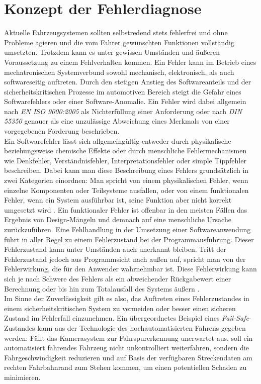 \section{Konzept der Fehlerdiagnose} \label{sec:KonzeptDiagnose} %

Aktuelle Fahrzeugsystemen sollten selbstredend stets fehlerfrei und ohne Probleme agieren und die vom Fahrer gewünschten Funktionen vollständig umsetzten. Trotzdem kann es unter gewissen Umständen und äußeren Voraussetzung zu einem Fehlverhalten kommen. Ein Fehler kann im Betrieb eines mechatronischen Systemverbund sowohl mechanisch, elektronisch, als auch softwareseitig auftreten. Durch den stetigen Anstieg des Softwareanteils und der sicherheitskritischen Prozesse im automotiven Bereich steigt die Gefahr eines Softwarefehlers oder einer Software-Anomalie. Ein Fehler wird dabei allgemein nach \emph{EN ISO 9000:2005} \cite{DINDeutschesInstitutfurNormunge.V..201511} als \glqq Nichterfüllung einer Anforderung\grqq{} oder nach \emph{DIN 55350} \cite{DINDeutschesInstitutfurNormunge.V..200805} genauer als \glqq eine unzulässige Abweichung eines Merkmals von einer vorgegebenen Forderung\grqq{} beschrieben. \\
Ein Softwarefehler lässt sich allgemeingültig entweder durch physikalische beziehungsweise chemische Effekte oder durch menschliche Fehlermechanismen wie Denkfehler, Verständnisfehler, Interpretationsfehler oder simple Tippfehler beschreiben. Dabei kann man diese Beschreibung eines Fehlers grundsätzlich in zwei Kategorien einordnen: Man spricht von einem physikalischen Fehler, wenn einzelne Komponenten oder Teilsysteme ausfallen, oder von einem funktionalen Fehler, wenn ein System ausführbar ist, seine Funktion aber nicht korrekt umgesetzt wird \cite{Borcsok.2007}. Ein funktionaler Fehler ist offenbar in den meisten Fällen das Ergebnis von Design-Mängeln und demnach auf eine menschliche Ursache zurückzuführen. Eine Fehlhandlung in der Umsetzung einer Softwareanwendung führt in aller Regel zu einem Fehlerzustand bei der Programmausführung. Dieser Fehlerzustand kann unter Umständen auch unerkannt bleiben. Tritt der Fehlerzustand jedoch aus Programmsicht nach außen auf, spricht man von der Fehlerwirkung, die für den Anwender wahrnehmbar ist. Diese Fehlerwirkung kann sich je nach Schwere des Fehlers als ein abweichender Rückgabewert einer Berechnung oder bis hin zum Totalausfall des Systems äußern \cite{ISTQBAISBLGermanTestingBoarde.V.2017}. \\
Im Sinne der Zuverlässigkeit gilt es also, das Auftreten eines Fehlerzustandes in einem sicherheitskritischen System zu vermeiden oder besser einen sicheren Zustand im Fehlerfall einzunehmen. Ein übergeordnetes Beispiel eines \emph{Fail-Safe}-Zustandes kann aus der Technologie des hochautomatisierten Fahrens gegeben werden: Fällt das Kamerasystem zur Fahrspurerkennung unerwartet aus, soll ein automatisiert fahrendes Fahrzeug nicht unkontrolliert weiterfahren, sondern die Fahrgeschwindigkeit reduzieren und auf Basis der verfügbaren Streckendaten am rechten Fahrbahnrand zum Stehen kommen, um einen potentiellen Schaden zu minimieren.
 
